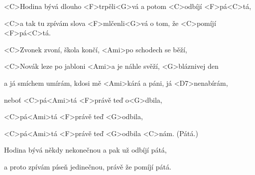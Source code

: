 
\zs
<C>Hodina bývá dlouho <F>trpěli<G>vá a potom <C>odbíjí <F>pá<C>tá,

<C>a tak tu zpívám slova <F>mlčenli<G>vá o tom, že <C>pomíjí <F>pá<C>tá.
\ks

\zr
<C>Zvonek zvoní, škola končí, <Ami>po schodech se běží,

<C>Novák leze po jabloni <Ami>a je náhle svěží, <G>bláznivej den

a já smíchem umírám, kdosi mě <Ami>kárá a páni, já <D7>nenabírám,

neboť <C>pá<Ami>tá <F>právě teď o<G>dbila,

<C>pá<Ami>tá <F>právě teď <G>odbila,

<C>pá<Ami>tá <F>právě teď <G>odbila <C>nám. (Pátá.)
\kr

\zs
Hodina bývá někdy nekonečnou a pak už odbíjí pátá,

a proto zpívám píseň jedinečnou, právě že pomíjí pátá.
\ks


\zr \kr

\kp





